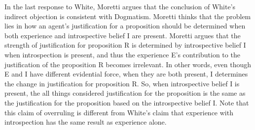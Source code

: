 In the last response to White, Moretti argues that the conclusion of
White's indirect objection is consistent with Dogmatism. Moretti thinks
that the problem lies in how an agent's justification for a proposition
should be determined when both experience and introspective belief I are
present. Moretti argues that the strength of justification for
proposition R is determined by introspective belief I when introspection
is present, and thus the experience E's contribution to the
justification of the proposition R becomes irrelevant. In other words,
even though E and I have different evidential force, when they are both
present, I determines the change in justification for proposition R. So,
when introspective belief I is present, the all things considered
justification for the proposition is the same as the justification for
the proposition based on the introspective belief I. Note that this
claim of overruling is different from White's claim that experience with
introspection has the same result as experience alone.

